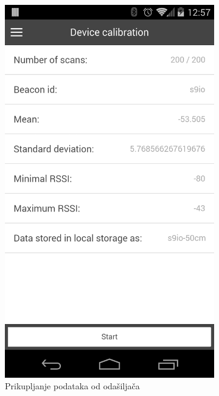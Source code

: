 \begin{figure}[H]
    \begin{subfigure}[b]{0.45\textwidth}
        \centering
        \includegraphics[scale=0.15]{pictures/experimental3}
        \caption{Prikupljanje podataka od odašiljača}
        \label{fig:exp3}
    \end{subfigure}
    ~
    \begin{subfigure}[b]{0.45\textwidth}
        \centering

\end{subfigure}
\end{figure}
